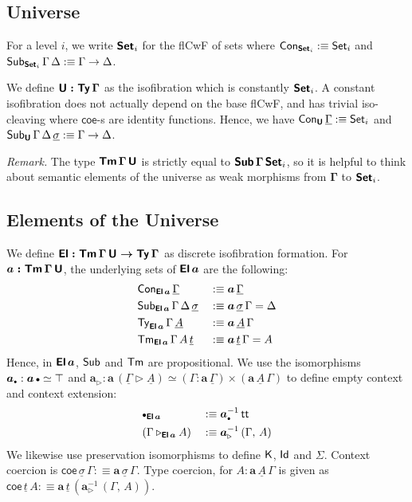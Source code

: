 \documentclass[sigplan,review,anonymous]{acmart}\settopmatter{printfolios=true,printccs=false,printacmref=false}
\newcommand{\ext}{\triangleright}
\newcommand{\emptycon}{\scaleobj{.75}\bullet}
\newcommand{\bSub}{\boldsymbol{\Sub}}
\newcommand{\bTm}{\boldsymbol{\Tm}}
\newcommand{\bGamma}{\boldsymbol{\Gamma}}
\newcommand{\ba}{\boldsymbol{a}}
\newcommand{\bSet}{\boldsymbol{\Set}}
\newcommand{\bU}{\boldsymbol{\U}}
\newcommand{\bEl}{\boldsymbol{\El}}
\newcommand{\ul}[1]{\underline{#1}}
\newcommand{\ulGamma}{\ul{\Gamma}}
\newcommand{\ulsigma}{\ul{\sigma}}
\newcommand{\ult}{\ul{t}}
\newcommand{\ulA}{\ul{A}}
\newcommand{\coe}{\mathsf{coe}}
\begin{document}
\subsection{Universe}
\label{sec:universe}

\begin{definition} For a level $i$, we write $\bSet_i$ for the flCwF of sets where $\Con_{\bSet_i} :\equiv \Set_i$ and $\Sub_{\bSet_i}\,\Gamma\,\Delta :\equiv \Gamma \ra \Delta$.
\end{definition}

We define $\boldsymbol{\mathsf{U} : \mathsf{Ty}\,\Gamma}$ as the isofibration which is
constantly $\bSet_i$. A constant isofibration does not actually depend on the
base flCwF, and has trivial iso-cleaving where $\coe$-s are identity
functions. Hence, we have $\Con_{\bU}\,\ulGamma :\equiv \Set_i$ and
$\Sub_{\bU}\,\Gamma\,\Delta\,\ulsigma :\equiv \Gamma \ra \Delta$.

\emph{Remark.} The type $\bTm\,\bGamma\,\bU$ is strictly equal to
$\bSub\,\bGamma\,\bSet_i$, so it is helpful to think about semantic elements of
the universe as weak morphisms from $\bGamma$ to $\bSet_i$.

\subsection{Elements of the Universe}

We define $\boldsymbol{\mathsf{El} : \mathsf{Tm}\,\Gamma\,\mathsf{U} \rightarrow \mathsf{Ty}\,\Gamma}$ as discrete
isofibration formation. For $\boldsymbol{a : \mathsf{Tm}\,\Gamma\,\mathsf{U}}$, the underlying
sets of $\bEl\,\ba$ are the following:
\begin{alignat*}{3}
  & \Con_{\bEl\,\ba}\,\ulGamma && :\equiv \ba\,\ulGamma\\
  & \Sub_{\bEl\,\ba}\,\Gamma\,\Delta\,\ulsigma && :\equiv \ba\,\ulsigma\,\Gamma = \Delta\\
  & \Ty_{\bEl\,\ba}\,\Gamma\,\ulA && :\equiv \ba\,\ulA\,\Gamma\\
  & \Tm_{\bEl\,\ba}\,\Gamma\,A\,\ult && :\equiv \ba\,\ult\,\Gamma = A
\end{alignat*}
Hence, in $\bEl\,\ba$, $\mathsf{Sub}$ and $\mathsf{Tm}$ are propositional. We use the
isomorphisms $\ba_{\emptycon} : \ba\,\emptycon \simeq \top$ and $\ba_{\ext} :
\ba\,(\ulGamma\ext\ulA) \simeq (\Gamma :
\ba\,\ulGamma)\times(\ba\,\ulA\,\Gamma)$ to define empty context and context
extension:
\begin{alignat*}{3}
  & \emptycon_{\bEl\,\ba} && :\equiv \ba_{\emptycon}^{-1}\,\tt\\
  & (\Gamma\ext_{\bEl\,\ba} A) && :\equiv \ba_{\ext}^{-1}\,(\Gamma,\,A)
\end{alignat*}
We likewise use preservation isomorphisms to define $\mathsf{K}$, $\mathsf{Id}$ and $\Sigma$.
Context coercion is $\coe\,\ulsigma\,\Gamma :\equiv \ba\,\ulsigma\,\Gamma$. Type coercion, for $A : \ba\,\ulA\,\Gamma$ is given as $\coe\,\ult\,A :\equiv \ba\,\ult\,(\ba_{\ext}^{-1}\,(\Gamma,\,A))$.
\end{document}
